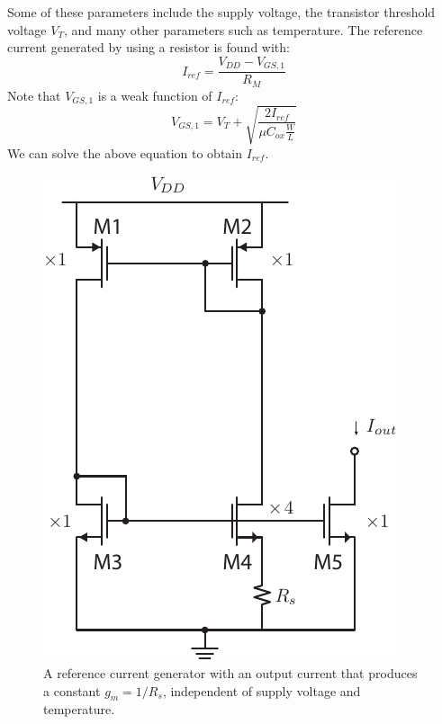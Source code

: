 Some of these parameters include the supply voltage, the transistor threshold voltage $V_T$, and many other parameters such as temperature.  The reference current generated by using a resistor is found with:
    \begin{equation}
        I_{ref} = \frac{V_{DD} - V_{GS,1}}{R_M}  
    \end{equation}
Note that $V_{GS,1}$ is a weak function of $I_{ref}$:
    \begin{equation}
        V_{GS,1} = V_T + \sqrt{\frac{2 I_{ref}}{\mu C_{ox} \frac{W}{L}}}
    \end{equation}
We can solve the above equation to obtain $I_{ref}$.
\begin{figure}[t]
\centering
\includegraphics[scale=1.35]{constant_gm_bias.pdf}
\caption{A reference current generator with an output current that produces a constant $g_m = 1/R_s$, independent of supply voltage and temperature.}
\label{fig:constant_gm_ref}
\end{figure}
